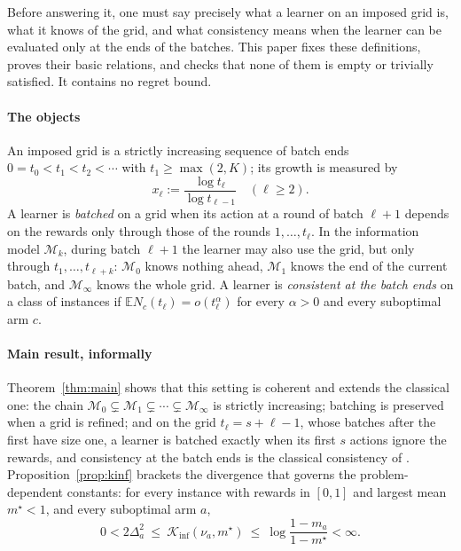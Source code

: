 \documentclass[11pt]{article}
\newcommand{\E}{\mathbb{E}}
\newcommand{\1}{\mathbf{1}}
\begin{document}
Before answering it, one must say precisely what a learner on an imposed grid is, what it knows of
the grid, and what consistency means when the learner can be evaluated only at the ends of the
batches. This paper fixes these definitions, proves their basic relations, and checks that none of
them is empty or trivially satisfied. It contains no regret bound.

\paragraph{The objects} An imposed grid is a strictly increasing sequence of batch ends
$0=t_0<t_1<t_2<\cdots$ with $t_1\ge\max(2,K)$; its growth is measured by
\begin{equation*}
  x_\ell := \frac{\log t_\ell}{\log t_{\ell-1}}\quad(\ell\ge2).
\end{equation*}
A learner is \emph{batched} on a grid when its action at a round of batch $\ell+1$ depends on the
rewards only through those of the rounds $1,\dots,t_\ell$. In the information model $\mathcal M_k$,
during batch $\ell+1$ the learner may also use the grid, but only through $t_1,\dots,t_{\ell+k}$:
$\mathcal M_0$ knows nothing ahead, $\mathcal M_1$ knows the end of the current batch, and
$\mathcal M_\infty$ knows the whole grid. A learner is \emph{consistent at the batch ends} on a class of
instances if $\E N_c(t_\ell)=o(t_\ell^\alpha)$ for every $\alpha>0$ and every suboptimal arm $c$.

\paragraph{Main result, informally} Theorem~\ref{thm:main} shows that this setting is coherent and
extends the classical one: the chain $\mathcal M_0\subsetneq\mathcal M_1\subsetneq\cdots\subsetneq\mathcal M_\infty$
is strictly increasing; batching is preserved when a grid is refined; and on the grid
$t_\ell=s+\ell-1$, whose batches after the first have size one, a learner is batched exactly when
its first $s$ actions ignore the rewards, and consistency at the batch ends is the classical
consistency of \citet[Definition~16.1]{LS}. Proposition~\ref{prop:kinf} brackets the divergence
that governs the problem-dependent constants: for every instance with rewards in $[0,1]$ and
largest mean $m^\star<1$, and every suboptimal arm $a$,
\begin{equation*}
  0<2\Delta_a^2\ \le\ \mathcal K_{\inf}(\nu_a,m^\star)\ \le\ \log\frac{1-m_a}{1-m^\star}<\infty .
\end{equation*}
\end{document}

